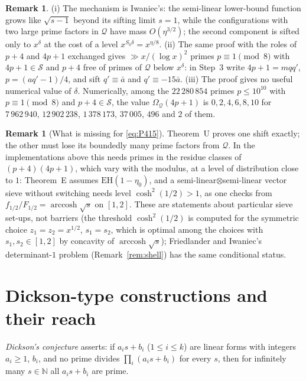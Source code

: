 \documentclass[11pt,reqno]{amsart}
\theoremstyle{definition}
\newtheorem{remark}[theorem]{Remark}
\newcommand{\N}{\mathbb N}
\newcommand{\cS}{\mathcal S}
\newcommand{\cQ}{\mathcal Q}
\newcommand{\EH}{\mathrm{EH}}
\begin{document}
\begin{remark}
(i) The mechanism is Iwaniec's: the semi-linear lower-bound function grows
like $\sqrt{s-1}$ beyond its sifting limit $s=1$, while the configurations
with two large prime factors in $\cQ$ have mass $O(\eta^{3/2})$; the second
component is sifted only to $x^\delta$ at the cost of a level
$x^{S_0\delta}=x^{\eta/8}$.  (ii) The same proof with the roles of $p+4$
and $4p+1$ exchanged gives $\gg x/(\log x)^2$ primes $p\equiv1\pmod8$
with $4p+1\in\cS$ and $p+4$ free of primes of $\cQ$ below $x^\delta$: in
Step~3 write $4p+1=mqq'$, $p=(aq'-1)/4$, and sift $q'\equiv\bar a$ and
$q'\equiv-15\bar a$.  (iii) The proof gives no useful numerical value of
$\delta$.  Numerically, among the $22\,280\,854$ primes $p\le10^{10}$ with
$p\equiv1\pmod 8$ and $p+4\in\cS$, the value $\Omega_\cQ(4p+1)$ is
$0,2,4,6,8,10$ for $7\,962\,940$, $12\,902\,238$, $1\,378\,173$,
$37\,005$, $496$ and $2$ of them.
\end{remark}

\begin{remark}[What is missing for \eqref{eq:P415}]
Theorem~U proves one shift exactly; the other must lose its boundedly many
prime factors from $\cQ$.  In the implementations above this needs
primes in the residue classes of $(p+4)(4p+1)$, which vary with the
modulus, at a level of distribution close to $1$: Theorem~E assumes
$\EH(1-\eta_0)$, and a semi-linear$\otimes$semi-linear vector sieve without
switching needs level $\cosh^2(1/2)>1$, as one checks from
$f_{1/2}/F_{1/2}=\operatorname{arccosh}\sqrt s$ on $[1,2]$.  These are
statements about particular sieve set-ups, not barriers (the threshold
$\cosh^2(1/2)$ is computed for the symmetric choice $z_1=z_2=x^{1/2}$,
$s_1=s_2$, which is optimal among the choices with $s_1,s_2\in[1,2]$ by
concavity of $\operatorname{arccosh}\sqrt s$); Friedlander and
Iwaniec's determinant-$1$ problem (Remark~\ref{rem:shell}) has the same
conditional status.
\end{remark}

\section{Dickson-type constructions and their reach}\label{sec:dickson}

\emph{Dickson's conjecture} \cite{Dickson} asserts: if $a_is+b_i$
($1\le i\le k$) are linear forms with integers $a_i\ge1$, $b_i$, and no
prime divides $\prod_i(a_is+b_i)$ for every $s$, then for infinitely many
$s\in\N$ all $a_is+b_i$ are prime.
\end{document}
